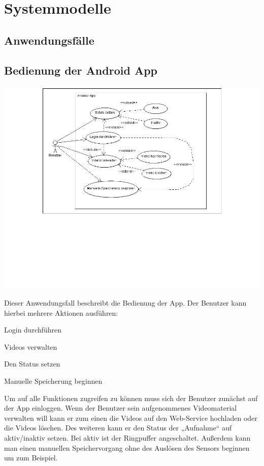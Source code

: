 \chapter{Systemmodelle}
\section{Anwendungsfälle}
\section{Bedienung der Android App}
\begin{center}
\includegraphics[width=1\textwidth]{subtopicsFuncspec/systemModels/AppAWFDiagram.png}
\end{center}
Dieser Anwendungsfall beschreibt die Bedienung der App. 
Der Benutzer kann hierbei mehrere Aktionen ausführen:
\begin{description}
\item Login durchführen
\item Videos verwalten
\item Den Status setzen
\item Manuelle Speicherung beginnen
\end{description}
Um auf alle Funktionen zugreifen zu können muss sich der Benutzer zunächst auf der App einloggen. 
Wenn der Benutzer sein aufgenommenes Videomaterial verwalten will kann er zum einen die Videos auf den Web-Service hochladen oder die Videos löschen.
Des weiteren kann er den Status der „Aufnahme“ auf aktiv/inaktiv setzen. Bei aktiv ist der Ringpuffer angeschaltet. 
Außerdem kann man einen manuellen Speichervorgang ohne des Auslösen des Sensors beginnen um zum Beispiel.


